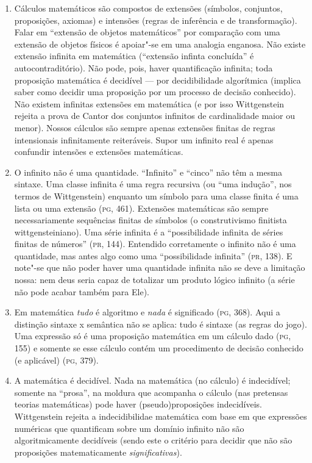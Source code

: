 {\begin{enumerate}
\item Cálculos matemáticos são compostos de extensões (símbolos,
conjuntos, proposições, axiomas) e intensões (regras de
inferência e de transformação). Falar em
``extensão de objetos
matemáticos'' por comparação com uma extensão de
objetos físicos é apoiar"-se em uma analogia enganosa. Não existe
extensão infinita em matemática (``extensão
infinta concluída'' é autocontraditório).  Não
pode, pois, haver quantificação infinita; toda proposição
matemática é decidível --- por decidibilidade algorítmica (implica
saber como decidir uma proposição por um processo de decisão
conhecido). Não existem infinitas extensões em matemática (e por
isso Wittgenstein rejeita a prova de Cantor dos conjuntos
infinitos de cardinalidade maior ou menor). Nossos cálculos são
sempre apenas extensões finitas de regras intensionais
infinitamente reiteráveis. Supor um infinito real é apenas
confundir intensões e extensões matemáticas.

\item O infinito não é uma quantidade.
``Infinito'' e
``cinco'' não têm a mesma
sintaxe. Uma classe infinita é uma regra recursiva (ou “uma
indução”, nos termos de Wittgenstein) enquanto um símbolo para
uma classe finita é uma lista ou uma extensão (\textsc{pg}, 461).
Extensões matemáticas são sempre necessariamente sequências
finitas de símbolos (o construtivismo finitista
wittgensteiniano). Uma série infinita é a “possibilidade
infinita de séries finitas de números” (\textsc{pr}, 144). Entendido
corretamente o infinito não é uma quantidade, mas antes algo
como uma “possibilidade infinita” (\textsc{pr}, 138). E note"-se que não
poder haver uma quantidade infinita não se deve a limitação
nossa: nem deus seria capaz de totalizar um produto lógico
infinito (a série não pode acabar também para Ele).

\item Em matemática \emph{tudo} é algoritmo e \emph{nada} é
significado (\textsc{pg}, 368). Aqui a distinção sintaxe x semântica não
se aplica: tudo é sintaxe (as regras do jogo). Uma expressão só
é uma proposição matemática em um cálculo dado (\textsc{pg}, 155) e
somente se esse cálculo contém um procedimento de decisão
conhecido (e aplicável) (\textsc{pg}, 379).

\item A matemática é decidível. Nada na matemática (no cálculo) é
indecidível; somente na
``prosa'', na moldura que
acompanha o cálculo (nas pretensas teorias matemáticas) pode
haver (pseudo)proposições indecidíveis. Wittgenstein rejeita a
indecidibilidae matemática com base em que expressões numéricas
que quantificam sobre um domínio infinito não são
algoritmicamente decidíveis (sendo este o critério para decidir
que não são proposições matematicamente
\emph{significativas}).


\end{enumerate}}
